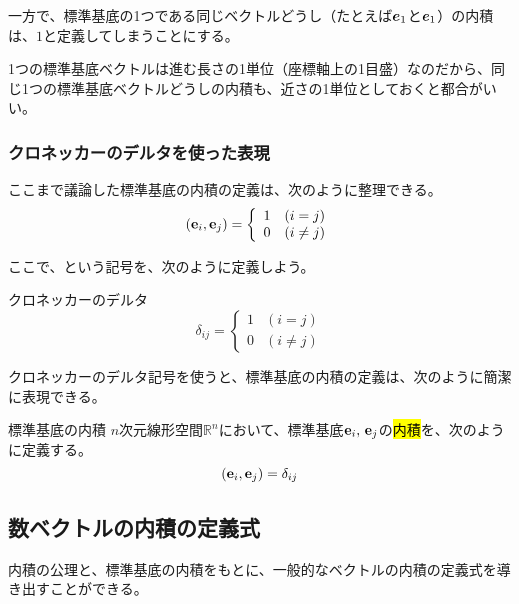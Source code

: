 \documentclass[../../imaging-math]{subfiles}
\begin{document}
一方で、標準基底の1つである同じベクトルどうし（たとえば$\vb*{e}_1$と$\vb*{e}_1$）の内積は、$1$と定義してしまうことにする。

1つの標準基底ベクトルは進む長さの1単位（座標軸上の1目盛）なのだから、同じ1つの標準基底ベクトルどうしの内積も、近さの1単位としておくと都合がいい。

\subsubsection{クロネッカーのデルタを使った表現}

ここまで議論した標準基底の内積の定義は、次のように整理できる。
\begin{equation*}
  (\vb{e}_i, \vb{e}_j) =
  \left\{
  \begin{array}{ll}
    1 & (i = j)    \\
    0 & (i \neq j)
  \end{array}
  \right.
\end{equation*}

ここで、という記号を、次のように定義しよう。

\begin{definition}{クロネッカーのデルタ}
  \Large
  \begin{equation*}
    \delta_{ij} =
    \left\{
    \begin{array}{ll}
      1 & (i = j)    \\
      0 & (i \neq j)
    \end{array}
    \right.
  \end{equation*}
\end{definition}

クロネッカーのデルタ記号を使うと、標準基底の内積の定義は、次のように簡潔に表現できる。

\begin{definition}{標準基底の内積}
  \titlegap
  $n$次元線形空間$\mathbb{R}^n$において、標準基底$\vb{e}_i,\, \vb{e}_j$の\hl{内積}を、次のように定義する。
  \Large
  \begin{equation*}
    (\vb{e}_i, \vb{e}_j) = \delta_{ij}
  \end{equation*}
\end{definition}

\subsection{数ベクトルの内積の定義式}

内積の公理と、標準基底の内積をもとに、一般的なベクトルの内積の定義式を導き出すことができる。
\end{document}
